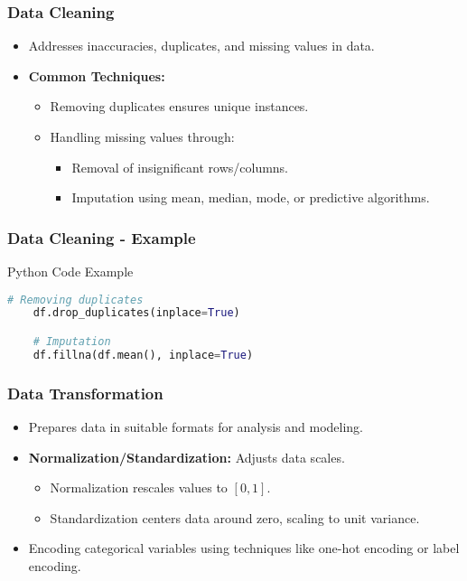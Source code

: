 \documentclass[aspectratio=169]{beamer}
\begin{document}
\begin{frame}
    \frametitle{Data Cleaning}
    \begin{itemize}
        \item Addresses inaccuracies, duplicates, and missing values in data.
        \item \textbf{Common Techniques:}
        \begin{itemize}
            \item Removing duplicates ensures unique instances.
            \item Handling missing values through:
            \begin{itemize}
                \item Removal of insignificant rows/columns.
                \item Imputation using mean, median, mode, or predictive algorithms.
            \end{itemize}
        \end{itemize}
    \end{itemize}
\end{frame}

\begin{frame}[fragile]
    \frametitle{Data Cleaning - Example}
    \begin{block}{Python Code Example}
    \begin{lstlisting}[language=Python]
    # Removing duplicates
    df.drop_duplicates(inplace=True)

    # Imputation
    df.fillna(df.mean(), inplace=True)
    \end{lstlisting}
    \end{block}
\end{frame}

\begin{frame}
    \frametitle{Data Transformation}
    \begin{itemize}
        \item Prepares data in suitable formats for analysis and modeling.
        \item \textbf{Normalization/Standardization:} Adjusts data scales.
            \begin{itemize}
                \item Normalization rescales values to \([0, 1]\).
                \item Standardization centers data around zero, scaling to unit variance.
            \end{itemize}
        \item Encoding categorical variables using techniques like one-hot encoding or label encoding.
    \end{itemize}
\end{frame}
\end{document}
